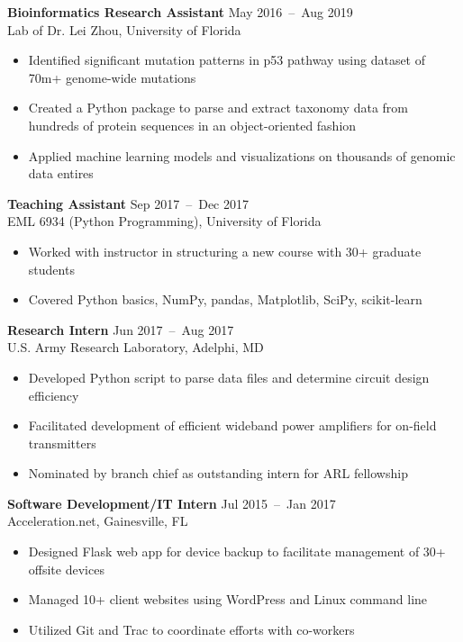 \documentclass[line,resmargin]{res}
\begin{document}
\begin{resume}
    \textbf{Bioinformatics Research Assistant}    \hfill May 2016~--~Aug 2019 \\
    Lab of Dr. Lei Zhou, University of Florida
    \begin{itemize}  \itemsep -2pt
        \item Identified significant mutation patterns in p53 pathway using dataset of 70m+ genome-wide mutations
        \item Created a Python package to parse and extract taxonomy data from hundreds of protein sequences in an object-oriented fashion
        \item Applied machine learning models and visualizations on thousands of genomic data entires
    \end{itemize}

    \textbf{Teaching Assistant}    \hfill Sep 2017~--~Dec 2017 \\
    EML 6934 (Python Programming), University of Florida
    \begin{itemize}  \itemsep -2pt
        \item Worked with instructor in structuring a new course with 30+ graduate students
        \item Covered Python basics, NumPy, pandas, Matplotlib, SciPy, scikit-learn
    \end{itemize}

    \textbf{Research Intern}    \hfill Jun 2017~--~Aug 2017 \\
    U.S. Army Research Laboratory, Adelphi, MD
    \begin{itemize}  \itemsep -2pt
        \item Developed Python script to parse data files and determine circuit design efficiency
        \item Facilitated development of efficient wideband power amplifiers for on-field transmitters
        \item Nominated by branch chief as outstanding intern for ARL fellowship
    \end{itemize}

    \textbf{Software Development/IT Intern}    \hfill Jul 2015~--~Jan 2017 \\
    Acceleration.net, Gainesville, FL
    \begin{itemize}  \itemsep -2pt
        \item Designed Flask web app for device backup to facilitate management of 30+ offsite devices
        \item Managed 10+ client websites using WordPress and Linux command line
        \item Utilized Git and Trac to coordinate efforts with co-workers
    \end{itemize}


\end{resume}
\end{document}
